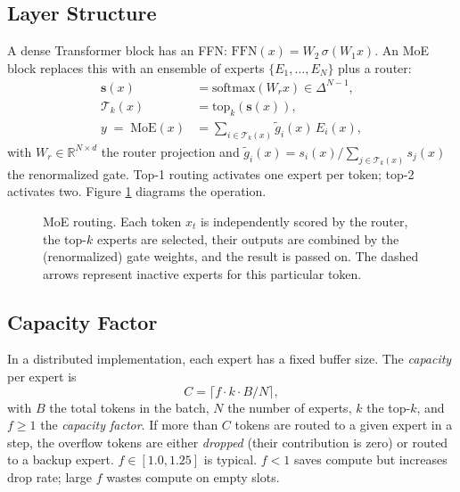 \subsection{Layer Structure}

A dense Transformer block has an FFN:
$\mathrm{FFN}(x) = W_2\,\sigma(W_1 x)$. An MoE block replaces this
with an ensemble of experts $\{E_1, \ldots, E_N\}$ plus a router:
\begin{align}
\label{eq:ch7-moe-router}
\mathbf{s}(x)        &= \mathrm{softmax}(W_r x)\in \Delta^{N-1}, \\
\label{eq:ch7-moe-topk}
\mathcal{T}_k(x)     &= \mathrm{top}_k(\mathbf{s}(x)), \\
\label{eq:ch7-moe-out}
y \;=\; \mathrm{MoE}(x)
  &= \sum_{i \in \mathcal{T}_k(x)} \tilde g_i(x)\,E_i(x),
\end{align}
with $W_r \in \mathbb{R}^{N \times d}$ the router projection and
$\tilde g_i(x) = s_i(x) / \sum_{j \in \mathcal{T}_k(x)} s_j(x)$ the
renormalized gate. Top-1 routing
\citep{fedus2021switch} activates one expert per token; top-2
\citep{shazeer2017outrageously, lepikhin2021gshard,jiang2024mixtral}
activates two. Figure \ref{fig:week6-moe-routing} diagrams the
operation.

\begin{figure}[h]
\centering

\caption{MoE routing. Each token $x_t$ is independently scored by
  the router, the top-$k$ experts are selected, their outputs are
  combined by the (renormalized) gate weights, and the result is
  passed on. The dashed arrows represent inactive experts for this
  particular token.}
\label{fig:week6-moe-routing}
\end{figure}

\subsection{Capacity Factor}

In a distributed implementation, each expert has a fixed buffer size.
The \emph{capacity} per expert is
\begin{equation}
\label{eq:ch7-capacity}
C = \lceil f \cdot k \cdot B / N \rceil,
\end{equation}
with $B$ the total tokens in the batch, $N$ the number of experts,
$k$ the top-$k$, and $f \ge 1$ the \emph{capacity factor}. If more
than $C$ tokens are routed to a given expert in a step, the overflow
tokens are either \emph{dropped} (their contribution is zero) or
routed to a backup expert. $f \in [1.0, 1.25]$ is typical. $f < 1$
saves compute but increases drop rate; large $f$ wastes compute on
empty slots.

